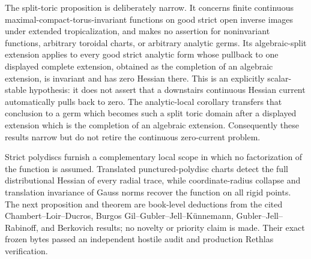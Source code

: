 The split-toric proposition is deliberately narrow.  It concerns finite
continuous maximal-compact-torus-invariant functions on good strict open
inverse images under extended tropicalization, and makes no assertion for
noninvariant functions, arbitrary toroidal charts, or arbitrary analytic
germs.  Its algebraic-split extension
 applies
to every good strict analytic form whose pullback to one displayed complete
extension, obtained as the completion of an algebraic extension, is invariant
and has zero Hessian there.  This is an explicitly scalar-stable hypothesis:
it does not assert that a downstairs continuous Hessian current automatically
pulls back to zero.  The
analytic-local corollary
transfers that conclusion to a germ which becomes such a split toric domain
after a displayed extension which is the completion of an algebraic
extension.  Consequently these results
narrow but do not retire the continuous zero-current problem.

Strict polydiscs furnish a complementary local scope in which no
factorization of the function is assumed.  Translated punctured-polydisc
charts detect the full distributional Hessian of every radial trace, while
coordinate-radius collapse and translation invariance of Gauss norms recover
the function on all rigid points.  The next proposition and theorem are
book-level deductions from the cited Chambert--Loir--Ducros,
Burgos Gil--Gubler--Jell--K\"unnemann, Gubler--Jell--Rabinoff, and Berkovich
results; no novelty or priority claim is made.  Their exact frozen bytes
passed an independent hostile audit and production Rethlas verification.

\begingroup
\providecommand{\an}{\mathrm{an}}


\begingroup
\makeatletter
\let\pzerosixtwo@original@nonumberplain\th@nonumberplain
\def\th@nonumberplain{%
  \pzerosixtwo@original@nonumberplain
  \def\@opargbegintheorem##1##2##3{%
    \item[\theorem@headerfont\hskip\labelsep ##3\theorem@separator]}}
\makeatother

\endgroup
\endgroup

